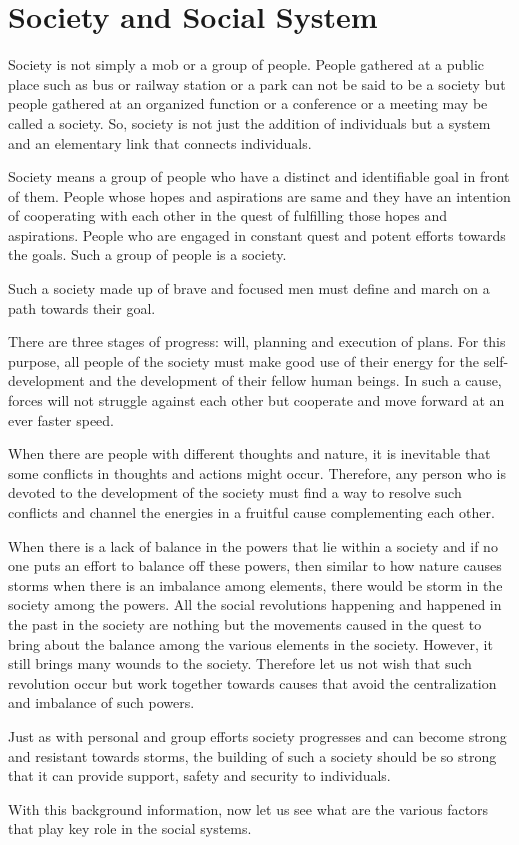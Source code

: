 \chapter{Society and Social System}
Society is not simply a mob or a group of people. People gathered at a public
place such as bus or railway station or a park can not be said to be a society
but people gathered at an organized function or a conference or a meeting may
be called a society. So, society is not just the addition of individuals but a
system and an elementary link that connects individuals.  

Society means a group of people who have a distinct and identifiable goal in
front of them. People whose hopes and aspirations are same and they have an
intention of cooperating with each other in the quest of fulfilling those
hopes and aspirations. People who are engaged in constant quest and potent
efforts towards the goals. Such a group of people is a society.

Such a society made up of brave and focused men must define and march on a path
towards their goal.

There are three stages of progress: will, planning and execution of plans. For
this purpose, all people of the society must make good use of their energy for
the self-development and the development of their fellow human beings. In such
a cause, forces will not struggle against each other but cooperate and move
forward at an ever faster speed.

When there are people with different thoughts and nature, it is inevitable that
some conflicts in thoughts and actions might occur. Therefore, any person who
is devoted to the development of the society must find a way to resolve such
conflicts and channel the energies in a fruitful cause complementing each
other. 

When there is a lack of balance in the powers that lie within a society and if
no one puts an effort to balance off these powers, then similar to how nature
causes storms when there is an imbalance among elements, there would be storm
in the society among the powers. All the social revolutions happening and
happened in the past in the society are nothing but the movements caused in the
quest to bring about the balance among the various elements in the society.
However, it still brings many wounds to the society. Therefore let us not wish
that such revolution occur but work together towards causes that avoid the
centralization and imbalance of such powers.

Just as with personal and group efforts society progresses and can become
strong and resistant towards storms, the building of such a society should be
so strong that it can provide support, safety and security to individuals.

With this background information, now let us see what are the various factors
that play key role in the social systems.

